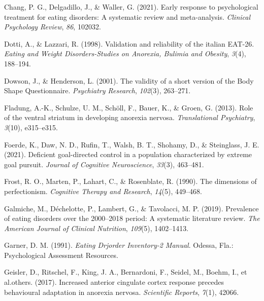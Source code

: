 \documentclass[
  man,floatsintext]{apa6}
\newlength{\cslhangindent}
\newlength{\cslentryspacingunit} %
\newenvironment{CSLReferences}[2] %
 {%
  \setlength{\parindent}{0pt}
  \ifodd #1
  \let\oldpar\par
  \def\par{\hangindent=\cslhangindent\oldpar}
  \fi
  \setlength{\parskip}{#2\cslentryspacingunit}
 }%
 {}
\begin{document}
\begin{CSLReferences}{1}{0}
\leavevmode{}%
Chang, P. G., Delgadillo, J., \& Waller, G. (2021). Early response to psychological treatment for eating disorders: A systematic review and meta-analysis. \emph{Clinical Psychology Review}, \emph{86}, 102032.

\leavevmode{}%
Dotti, A., \& Lazzari, R. (1998). Validation and reliability of the italian {EAT-26}. \emph{Eating and Weight Disorders-Studies on Anorexia, Bulimia and Obesity}, \emph{3}(4), 188--194.

\leavevmode{}%
Dowson, J., \& Henderson, L. (2001). The validity of a short version of the {Body Shape Questionnaire}. \emph{Psychiatry Research}, \emph{102}(3), 263--271.

\leavevmode{}%
Fladung, A.-K., Schulze, U. M., Schöll, F., Bauer, K., \& Groen, G. (2013). Role of the ventral striatum in developing anorexia nervosa. \emph{Translational Psychiatry}, \emph{3}(10), e315--e315.

\leavevmode{}%
Foerde, K., Daw, N. D., Rufin, T., Walsh, B. T., Shohamy, D., \& Steinglass, J. E. (2021). Deficient goal-directed control in a population characterized by extreme goal pursuit. \emph{Journal of Cognitive Neuroscience}, \emph{33}(3), 463--481.

\leavevmode{}%
Frost, R. O., Marten, P., Lahart, C., \& Rosenblate, R. (1990). The dimensions of perfectionism. \emph{Cognitive Therapy and Research}, \emph{14}(5), 449--468.

\leavevmode{}%
Galmiche, M., Déchelotte, P., Lambert, G., \& Tavolacci, M. P. (2019). Prevalence of eating disorders over the 2000--2018 period: A systematic literature review. \emph{The American Journal of Clinical Nutrition}, \emph{109}(5), 1402--1413.

\leavevmode{}%
Garner, D. M. (1991). \emph{{Eating Drjorder Inventory-2 Manual}}. Odessa, Fla.: Psychological Assessment Resources.

\leavevmode{}%
Geisler, D., Ritschel, F., King, J. A., Bernardoni, F., Seidel, M., Boehm, I., et al.others. (2017). Increased anterior cingulate cortex response precedes behavioural adaptation in anorexia nervosa. \emph{Scientific Reports}, \emph{7}(1), 42066.


\end{CSLReferences}
\end{document}
